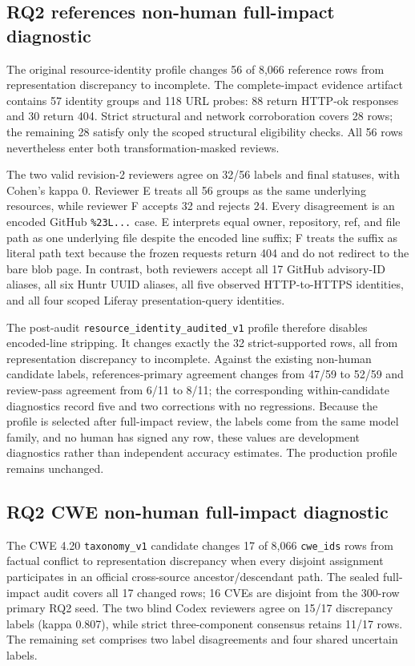\subsection{RQ2 references non-human full-impact diagnostic}

The original resource-identity profile changes 56 of 8,066 reference rows from representation discrepancy to incomplete. The complete-impact evidence artifact contains 57 identity groups and 118 URL probes: 88 return HTTP-ok responses and 30 return 404. Strict structural and network corroboration covers 28 rows; the remaining 28 satisfy only the scoped structural eligibility checks. All 56 rows nevertheless enter both transformation-masked reviews.

The two valid revision-2 reviewers agree on 32/56 labels and final statuses, with Cohen's kappa 0. Reviewer E treats all 56 groups as the same underlying resources, while reviewer F accepts 32 and rejects 24. Every disagreement is an encoded GitHub \texttt{\%23L...} case. E interprets equal owner, repository, ref, and file path as one underlying file despite the encoded line suffix; F treats the suffix as literal path text because the frozen requests return 404 and do not redirect to the bare blob page. In contrast, both reviewers accept all 17 GitHub advisory-ID aliases, all six Huntr UUID aliases, all five observed HTTP-to-HTTPS identities, and all four scoped Liferay presentation-query identities.

The post-audit \texttt{resource\_identity\_audited\_v1} profile therefore disables encoded-line stripping. It changes exactly the 32 strict-supported rows, all from representation discrepancy to incomplete. Against the existing non-human candidate labels, references-primary agreement changes from 47/59 to 52/59 and review-pass agreement from 6/11 to 8/11; the corresponding within-candidate diagnostics record five and two corrections with no regressions. Because the profile is selected after full-impact review, the labels come from the same model family, and no human has signed any row, these values are development diagnostics rather than independent accuracy estimates. The production profile remains unchanged.

\subsection{RQ2 CWE non-human full-impact diagnostic}

The CWE 4.20 \texttt{taxonomy\_v1} candidate changes 17 of 8,066 \texttt{cwe\_ids} rows from factual conflict to representation discrepancy when every disjoint assignment participates in an official cross-source ancestor/descendant path. The sealed full-impact audit covers all 17 changed rows; 16 CVEs are disjoint from the 300-row primary RQ2 seed. The two blind Codex reviewers agree on 15/17 discrepancy labels (kappa 0.807), while strict three-component consensus retains 11/17 rows. The remaining set comprises two label disagreements and four shared uncertain labels.

